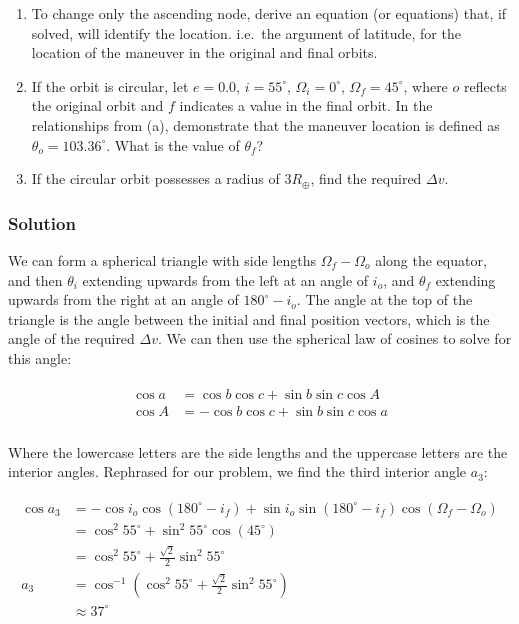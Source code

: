 \documentclass[
]{article}
\providecommand{\tightlist}{%
  \setlength{\itemsep}{0pt}\setlength{\parskip}{0pt}}
\begin{document}
\begin{enumerate}
\tightlist
\item
  To change only the ascending node, derive an equation (or equations)
  that, if solved, will identify the location. i.e.~the argument of
  latitude, for the location of the maneuver in the original and final
  orbits.
\item
  If the orbit is circular, let \(e=0.0\), \(i=55^\circ\),
  \(\Omega_i=0^\circ\), \(\Omega_f=45^\circ\), where \(o\) reflects the
  original orbit and \(f\) indicates a value in the final orbit. In the
  relationships from (a), demonstrate that the maneuver location is
  defined as \(\theta_o = 103.36^\circ\). What is the value of
  \(\theta_f\)?
\item
  If the circular orbit possesses a radius of \(3R_\oplus\), find the
  required \(\Delta v\).
\end{enumerate}

\subsubsection{Solution}\label{solution-1}

We can form a spherical triangle with side lengths
\(\Omega_f - \Omega_o\) along the equator, and then \(\theta_i\)
extending upwards from the left at an angle of \(i_o\), and \(\theta_f\)
extending upwards from the right at an angle of \(180^\circ-i_o\). The
angle at the top of the triangle is the angle between the initial and
final position vectors, which is the angle of the required \(\Delta v\).
We can then use the spherical law of cosines to solve for this angle:

\[\begin{aligned}
\begin{aligned}
    \cos a &= \cos b \cos c + \sin b \sin c \cos A \\
    \cos A &= - \cos b \cos c + \sin b \sin c \cos a \\
\end{aligned}
\end{aligned}\]

Where the lowercase letters are the side lengths and the uppercase
letters are the interior angles. Rephrased for our problem, we find the
third interior angle \(a_3\):

\[\begin{aligned}
\begin{aligned}
    \cos a_3 &= - \cos i_o \cos (180^\circ - i_f) + \sin i_o \sin (180^\circ - i_f) \cos(\Omega_f - \Omega_o) \\
    &= \cos^2 55^\circ + \sin^2 55^\circ \cos(45^\circ) \\
    &= \cos^2 55^\circ + \frac{\sqrt{2}}{2} \sin^2 55^\circ \\
    a_3 &= \cos^{-1} \left( \cos^2 55^\circ + \frac{\sqrt{2}}{2} \sin^2 55^\circ \right) \\
    &\approx 37^\circ \\
\end{aligned}
\end{aligned}\]
\end{document}
